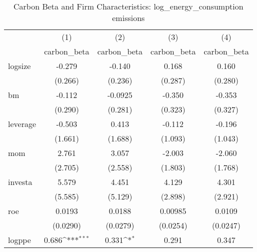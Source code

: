 \begin{table}[htbp]\centering
\def\sym#1{\ifmmode^{#1}\else\(^{#1}\)\fi}
\caption{Carbon Beta and Firm Characteristics: log\_energy\_consumption emissions}
\begin{tabular}{l*{4}{c}}
\hline\hline
                    &\multicolumn{1}{c}{(1)}&\multicolumn{1}{c}{(2)}&\multicolumn{1}{c}{(3)}&\multicolumn{1}{c}{(4)}\\
                    &\multicolumn{1}{c}{carbon\_beta}&\multicolumn{1}{c}{carbon\_beta}&\multicolumn{1}{c}{carbon\_beta}&\multicolumn{1}{c}{carbon\_beta}\\
\hline
logsize             &      -0.279         &      -0.140         &       0.168         &       0.160         \\
                    &     (0.266)         &     (0.236)         &     (0.287)         &     (0.280)         \\
[1em]
bm                  &      -0.112         &     -0.0925         &      -0.350         &      -0.353         \\
                    &     (0.290)         &     (0.281)         &     (0.323)         &     (0.327)         \\
[1em]
leverage            &      -0.503         &       0.413         &      -0.112         &      -0.196         \\
                    &     (1.661)         &     (1.688)         &     (1.093)         &     (1.043)         \\
[1em]
mom                 &       2.761         &       3.057         &      -2.003         &      -2.060         \\
                    &     (2.705)         &     (2.558)         &     (1.803)         &     (1.768)         \\
[1em]
investa             &       5.579         &       4.451         &       4.129         &       4.301         \\
                    &     (5.585)         &     (5.129)         &     (2.898)         &     (2.921)         \\
[1em]
roe                 &      0.0193         &      0.0188         &     0.00985         &      0.0109         \\
                    &    (0.0290)         &    (0.0279)         &    (0.0254)         &    (0.0247)         \\
[1em]
logppe              &       0.686\sym{***}&       0.331\sym{*}  &       0.291         &       0.347         \\

\end{tabular}
\end{table}

